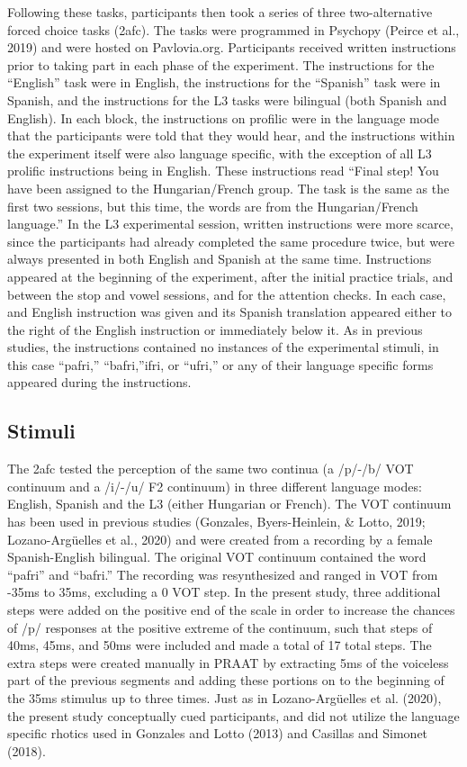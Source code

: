 \documentclass[
  english,
  man]{apa6}
\begin{document}
Following these tasks, participants then took a series of three two-alternative forced choice tasks (2afc).
The tasks were programmed in Psychopy (Peirce et al., 2019) and were hosted on Pavlovia.org.
Participants received written instructions prior to taking part in each phase of the experiment. The instructions for the ``English'' task were in English, the instructions for the ``Spanish'' task were in Spanish, and the instructions for the L3 tasks were bilingual (both Spanish and English). In each block, the instructions on profilic were in the language mode that the participants were told that they would hear, and the instructions within the experiment itself were also language specific, with the exception of all L3 prolific instructions being in English. These instructions read ``Final step! You have been assigned to the Hungarian/French group.
The task is the same as the first two sessions, but this time, the words are from the Hungarian/French language.'' In the L3 experimental session, written instructions were more scarce, since the participants had already completed the same procedure twice, but were always presented in both English and Spanish at the same time. Instructions appeared at the beginning of the experiment, after the initial practice trials, and between the stop and vowel sessions, and for the attention checks. In each case, and English instruction was given and its Spanish translation appeared either to the right of the English instruction or immediately below it.
As in previous studies, the instructions contained no instances of the experimental stimuli, in this case ``pafri,'' ``bafri,''ifri, or ``ufri,'' or any of their language specific forms appeared during the instructions.

\hypertarget{stimuli}{%
\subsection{Stimuli}\label{stimuli}}

The 2afc tested the perception of the same two continua (a /p/-/b/ VOT continuum and a /i/-/u/ F2 continuum) in three different language modes: English, Spanish and the L3 (either Hungarian or French). The VOT continuum has been used in previous studies (Gonzales, Byers-Heinlein, \& Lotto, 2019; Lozano-Argüelles et al., 2020) and were created from a recording by a female Spanish-English bilingual. The original VOT continuum contained the word ``pafri'' and ``bafri.'' The recording was resynthesized and ranged in VOT from -35ms to 35ms, excluding a 0 VOT step. In the present study, three additional steps were added on the positive end of the scale in order to increase the chances of /p/ responses at the positive extreme of the continuum, such that steps of 40ms, 45ms, and 50ms were included and made a total of 17 total steps. The extra steps were created manually in PRAAT by extracting 5ms of the voiceless part of the previous segments and adding these portions on to the beginning of the 35ms stimulus up to three times.
Just as in Lozano-Argüelles et al. (2020), the present study conceptually cued participants, and did not utilize the language specific rhotics used in Gonzales and Lotto (2013) and Casillas and Simonet (2018).
\end{document}
